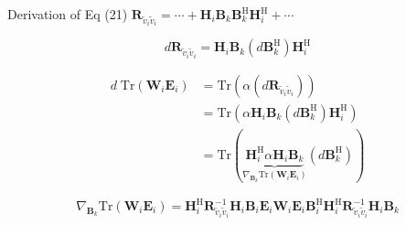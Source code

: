 \documentclass[aspectratio=169, 10pt]{beamer}
\begin{document}
\begin{frame}{Derivation of Eq (21)}
    $\mathbf{R}_{\tilde{v}_i \tilde{v}_i}= \cdots +
        \mathbf{H}_i\mathbf{B}_k
        \mathbf{B}_k^\mathrm{H}\mathbf{H}_i^\mathrm{H} + \cdots$

    \begin{equation*}
        d\mathbf{R}_{\tilde{v}_i \tilde{v}_i}= \mathbf{H}_i\mathbf{B}_k
        \left(d\mathbf{B}_k^\mathrm{H}\right)
        \mathbf{H}_i^\mathrm{H}
    \end{equation*}

    \begin{align*}
        d\;\mathrm{Tr}\left(\mathbf{W}_i \mathbf{E}_i\right)
         & = \mathrm{Tr}\left(
        \alpha
        \left(d\mathbf{R}_{\tilde{v}_i \tilde{v}_i}\right)
        \right)                \\
         & = \mathrm{Tr}\left(
        \alpha
        \mathbf{H}_i\mathbf{B}_k
        \left(d\mathbf{B}_k^\mathrm{H}\right)
        \mathbf{H}_i^\mathrm{H}
        \right)                \\
         & = \mathrm{Tr}\left(
        \underbrace{
            \mathbf{H}_i^\mathrm{H}
            \alpha
            \mathbf{H}_i\mathbf{B}_k
        }_{\nabla_{\mathbf{B}_k}\mathrm{Tr}\left(\mathbf{W}_i \mathbf{E}_i\right)}
        \left(d\mathbf{B}_k^\mathrm{H}\right)
        \right)
    \end{align*}


    \begin{equation}
        \nabla_{\mathbf{B}_k}\mathrm{Tr}\left(\mathbf{W}_i \mathbf{E}_i\right) = \mathbf{H}_i^\mathrm{H} \mathbf{R}_{\tilde{v}_i \tilde{v}_i}^{-1} \mathbf{H}_i \mathbf{B}_i \mathbf{E}_i\mathbf{W}_i \mathbf{E}_i \mathbf{B}_i^{\mathrm{H}} \mathbf{H}_i^{\mathrm{H}} \mathbf{R}_{\tilde{v}_i \tilde{v}_i}^{-1} \mathbf{H}_i\mathbf{B}_k \tag{21}
    \end{equation}

    \begin{flushright}
        \hyperlink{main-wmmse-grad}{}
    \end{flushright}
\end{frame}



\end{document}
